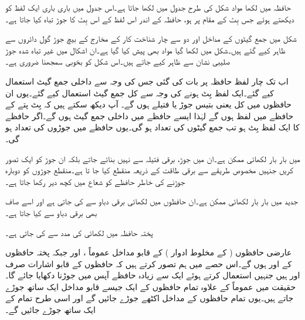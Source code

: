 حافظہ میں  لکھا  مواد شکل کی طرح جدول میں لکھا جاتا ہے۔اس جدول میں    باری باری ایک لفظ کو  دیکھتے ہوئے جس بِٹ کے مقام پر  ہو،  حافظہ کے اندر اس لفظ کے اس بِٹ کا جوڑ تباہ کیا جاتا ہے۔


شکل  میں  جمع گیٹوں کے مداخل اور دو سے چار شناخت کار کے مخارج کے  بیچ جوڑ گول دائروں سے  ظاہر کیے  گئے ہیں۔شکل  میں لکھا گیا مواد   بھی   پیش کیا گیا ہے۔ان  اشکال میں غیر تباہ شدہ جوڑ  صلیبی نشان   سے ظاہر کیے  جاتے ہیں۔اس شکل کو بخوبی سمجھنا  ضروری ہے۔

اب تک  چار لفظ  حافظہ  پر بات کی گئی جس کی وجہ سے   داخلی جمع گیٹ استعمال کیے گئے۔ایک لفظ   بِٹ ہونے کی وجہ سے کل   جمع گیٹ استعمال کیے گئے۔یوں  ان حافظوں  میں کل  یعنی  بتیس    جوڑ یا  فتیلے  ہوں گے۔ آپ دیکھ سکتے ہیں کہ  بِٹ پتے    کے حافظے میں   لفظ ہوں گے لہٰذا ایسے حافظے میں   داخلی جمع گیٹ  ہوں گے۔اگر حافظے  کا ایک لفظ  بِٹ ہو تب جمع گیٹوں کی تعداد  ہو گی۔یوں حافظے میں جوڑوں کی تعداد   ہو گی۔

 میں بار بار لکھائی ممکن ہے۔ان  میں   جوڑ، برقی فتیلہ سے نہیں بنائے جاتے بلکہ ان   جوڑ کو ایک تصور  کریں جنہیں مخصوص طریقے سے برقی طاقت کے ذریعہ منقطع کیا جا تا ہے۔منقطع جوڑوں کو دوبارہ جوڑنے کی خاطر حافظے  کو شعاع  میں کچھ دیر رکھا جاتا ہے۔

جدید میں  بار بار لکھائی ممکن ہے۔ان حافظوں میں لکھائی برقی دباو سے کی جاتی ہے اور اسے صاف بھی برقی دباو سے  کیا جاتا ہے۔

پختہ حافظہ میں لکھائی  کی مدد سے کی جاتی ہے۔
	

عارضی حافظوں ( کے   مخلوط  ادوار ) کے قابو  مداخل   عموماً ،   اور    جبکہ پختہ حافظوں کے    اور    ہوں گے۔اس حصے میں  ہم تصور کرتے ہیں کہ  حافظوں   کے قابو  اشارات صرف  اور     ہیں  جنہیں  استعمال کرتے ہوئے   ایک سے زیادہ حافظے آپس میں جوڑنا دکھایا جائے گا۔حقیقت میں  عموماً    کے علاوہ تمام حافظوں کے ایک جیسے قابو مداخل  ایک ساتھ جوڑے جاتے ہیں۔یوں تمام حافظوں  کے     مداخل اکٹھے جوڑے جائیں گے اور اسی طرح    تمام کے      ایک ساتھ جوڑے جائیں گے۔

